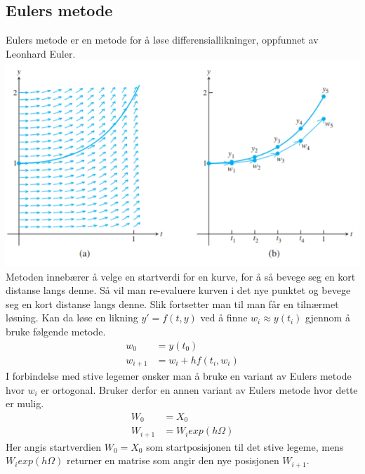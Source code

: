 \graphicspath{ {./bilder/} }

\subsection{Eulers metode}
Eulers metode er en metode for å løse differensiallikninger, oppfunnet av Leonhard Euler. \newline
\includegraphics{rapport/metode/bilder/eulers.png}\newline\newline
Metoden innebærer å velge en startverdi for en kurve, for å så bevege seg en kort distanse langs denne. Så vil man re-evaluere kurven i det nye punktet og bevege seg en kort distanse langs denne. Slik fortsetter man til man får en tilnærmet løsning.\newline\newline
Kan da løse en likning $y' = f(t, y)$ ved å finne $w_i \approx y(t_i)$ gjennom å bruke følgende metode.
\begin{equation}
\begin{aligned}
    w_0&=y(t_0)\\
    w_{i+1}&=w_i + hf(t_i, w_i)
\end{aligned}
\end{equation}
I forbindelse med stive legemer ønsker man å bruke en variant av Eulers metode hvor $w_i$ er ortogonal. Bruker derfor en annen variant av Eulers metode hvor dette er mulig.
\begin{equation}
\begin{aligned}
    W_0&=X_0\\
    W_{i+1}&=W_iexp(h\Omega)
\end{aligned}
\end{equation}
Her angis startverdien $W_0=X_0$ som startposisjonen til det stive legeme, mens $W_iexp(h\Omega)$ returner en matrise som angir den nye posisjonen $W_{i+1}$.


